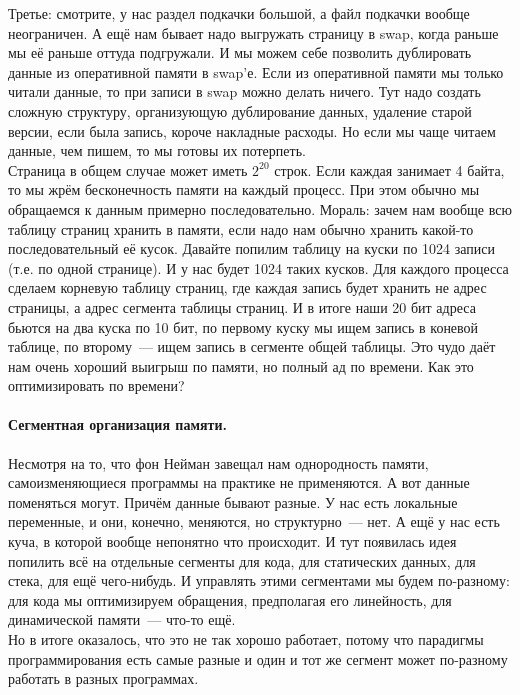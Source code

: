 \documentclass{article}
\begin{document}
    Третье: смотрите, у нас раздел подкачки большой, а файл подкачки вообще неограничен. А ещё нам бывает надо выгружать страницу в swap, когда раньше мы её раньше оттуда подгружали. И мы можем себе позволить дублировать данные из оперативной памяти в swap'е. Если из оперативной памяти мы только читали данные, то при записи в swap можно делать ничего. Тут надо создать сложную структуру, организующую дублирование данных, удаление старой версии, если была запись, короче накладные расходы. Но если мы чаще читаем данные, чем пишем, то мы готовы их потерпеть.\\
    Страница в общем случае может иметь $2^{20}$ строк. Если каждая занимает 4 байта, то мы жрём бесконечность памяти на каждый процесс. При этом обычно мы обращаемся к данным примерно последовательно. Мораль: зачем нам вообще всю таблицу страниц хранить в памяти, если надо нам обычно хранить какой-то последовательный её кусок. Давайте попилим таблицу на куски по 1024 записи (т.е. по одной странице). И у нас будет 1024 таких кусков. Для каждого процесса сделаем корневую таблицу страниц, где каждая запись будет хранить не адрес страницы, а адрес сегмента таблицы страниц. И в итоге наши 20 бит адреса бьются на два куска по 10 бит, по первому куску мы ищем запись в коневой таблице, по второму~--- ищем запись в сегменте общей таблицы. Это чудо даёт нам очень хороший выигрыш по памяти, но полный ад по времени. Как это оптимизировать по времени?\\
    \paragraph{Сегментная организация памяти.}
    Несмотря на то, что фон Нейман завещал нам однородность памяти, самоизменяющиеся программы на практике не применяются. А вот данные поменяться могут. Причём данные бывают разные. У нас есть локальные переменные, и они, конечно, меняются, но структурно~--- нет. А ещё у нас есть куча, в которой вообще непонятно что происходит. И тут появилась идея попилить всё на отдельные сегменты для кода, для статических данных, для стека, для ещё чего-нибудь. И управлять этими сегментами мы будем по-разному: для кода мы оптимизируем обращения, предполагая его линейность, для динамической памяти~--- что-то ещё.\\
    Но в итоге оказалось, что это не так хорошо работает, потому что парадигмы программирования есть самые разные и один и тот же сегмент может по-разному работать в разных программах.
\end{document}
